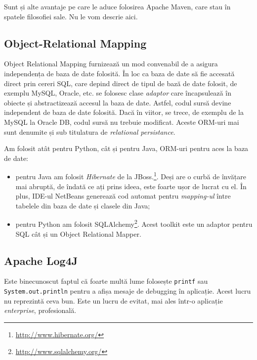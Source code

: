 Sunt și alte avantaje pe care le aduce folosirea Apache Maven, care stau în spatele filosofiei sale. Nu le vom descrie aici.

\subsection{Object-Relational Mapping}



Object Relational Mapping furnizează un mod convenabil de a asigura independența de baza de date folosită. În loc ca baza de date să fie accesată direct prin cereri SQL, care depind direct de tipul de bază de date folosit, de exemplu MySQL, Oracle, etc. se folosesc clase \textit{adaptor} care încapsulează în obiecte și abstractizează accesul la baza de date. Astfel, codul sursă devine independent de baza de date folosită. Dacă în viitor, se trece, de exemplu de la MySQL la Oracle DB, codul sursă nu trebuie modificat. Aceste ORM-uri mai sunt denumite și sub titulatura de \textit{relational persistance}.

Am folosit atât pentru Python, cât și pentru Java, ORM-uri pentru aces la baza de date:
\begin{itemize}
\item pentru Java am folosit \textit{Hibernate} de la JBoss.\footnote{\url{http://www.hibernate.org/}}. Deși are o curbă de învățare mai abruptă, de îndată ce ați prins ideea, este foarte ușor de lucrat cu el. În plus, IDE-ul NetBeans generează cod automat pentru \textit{mapping-ul} între tabelele din baza de date și clasele din Java;

\item pentru Python am folosit SQLAlchemy\footnote{\url{http://www.sqlalchemy.org/}}. Acest toolkit este un adaptor pentru SQL cât și un Object Relational Mapper.

\end{itemize}


\subsection{Apache Log4J}

Este binecunoscut faptul că foarte multă lume folosește \texttt{printf} sau \texttt{System.out.println} pentru a afișa mesaje de debugging în aplicație. Acest lucru nu reprezintă ceva bun. Este un lucru de evitat, mai ales într-o aplicație \textit{enterprise}, profesională.

